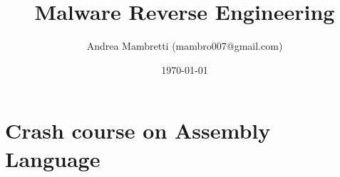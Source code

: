 \documentclass[]{beamer}
\title{Malware Reverse Engineering}    %
\author{Andrea Mambretti (mambro007@gmail.com)}        %
\institute{Politecnico di Milano}      %
\date{\today}                    %
\begin{document}
\begin{frame}
  \titlepage
\end{frame}

\section[Outline]{}

\begin{frame}
  \tableofcontents
\end{frame}
\section {Crash course on Assembly Language}
\end{document}
